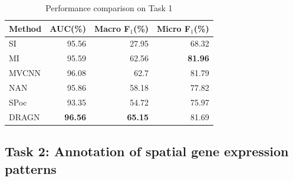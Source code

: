 \documentclass[10pt,twocolumn,letterpaper]{article}
\begin{document}
\begin{table}
\normalsize
\begin{center}
\begin{tabular}{|l|r|r|r|}

\hline
Method & AUC(\%) & Macro F$_1$(\%) & Micro F$_1$(\%)\\
\hline\hline
SI & 95.56&  27.95& 68.32\\
 MI & 95.59&62.56& \textbf{81.96}\\
 MVCNN & 96.08&62.7& 81.79\\
NAN & 95.86&58.18&77.82 \\
SPoc &   93.35& 54.72& 75.97\\
DRAGN & \textbf{96.56}& \textbf{65.15}  &81.69\\
\hline
\end{tabular}
\end{center}
\caption{Performance comparison on Task 1}\label{tab:base}
\end{table}



\subsection{Task 2: Annotation of spatial gene expression patterns}

\end{document}
